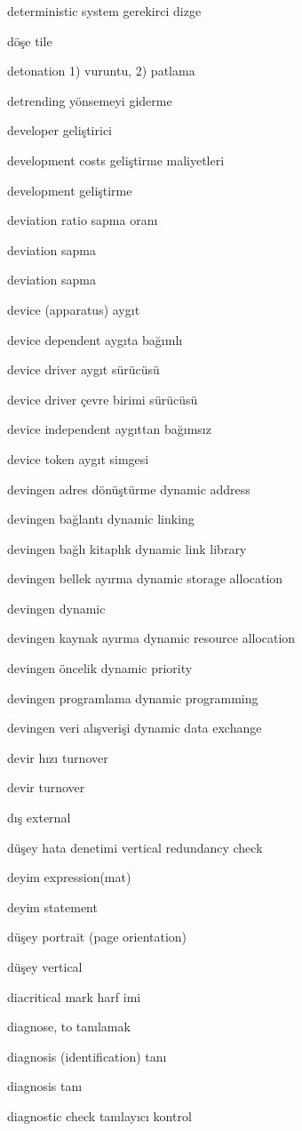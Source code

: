 \documentclass[12pt,fleqn]{article}\usepackage{../../common}
\begin{document}
deterministic system gerekirci dizge

döşe tile

detonation 1) vuruntu, 2) patlama

detrending yönsemeyi giderme

developer geliştirici

development costs geliştirme maliyetleri

development geliştirme

deviation ratio sapma oranı

deviation sapma

deviation sapma

device (apparatus) aygıt

device dependent aygıta bağımlı

device driver aygıt sürücüsü

device driver çevre birimi sürücüsü

device independent aygıttan bağımsız

device token aygıt simgesi

devingen adres dönüştürme dynamic address

devingen bağlantı dynamic linking

devingen bağlı kitaplık dynamic link library

devingen bellek ayırma dynamic storage allocation

devingen dynamic

devingen kaynak ayırma dynamic resource allocation

devingen öncelik dynamic priority

devingen programlama dynamic programming

devingen veri alışverişi dynamic data exchange

devir hızı turnover

devir turnover

dış external

düşey hata denetimi vertical redundancy check

deyim expression(mat)

deyim statement

düşey portrait (page orientation)

düşey vertical

diacritical mark harf imi

diagnose, to tanılamak

diagnosis (identification) tanı

diagnosis tanı

diagnostic check tanılayıcı kontrol
\end{document}
